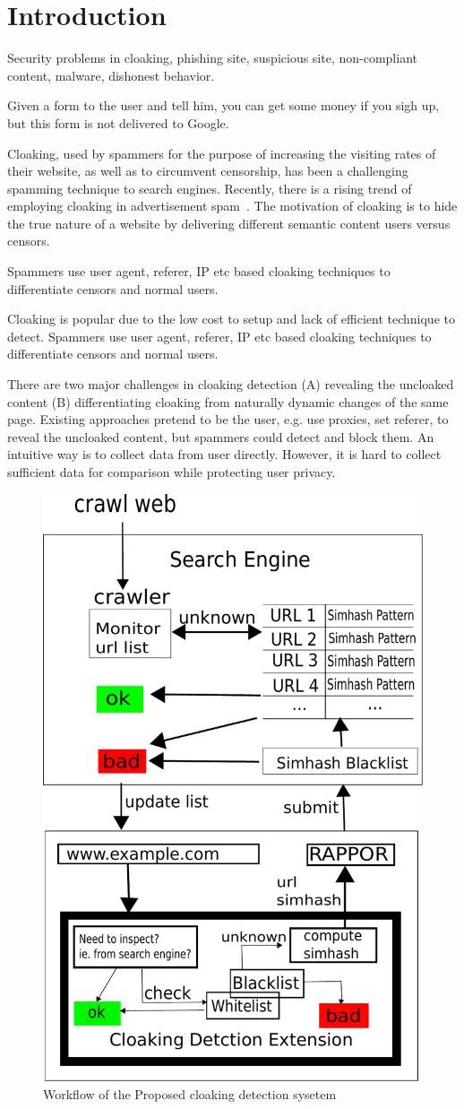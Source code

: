 \section{Introduction}
\label{s:intro}

Security problems in cloaking, phishing site, suspicious site, non-compliant
content, malware, dishonest behavior.

Given a form to the user and tell him, you can get some money if you sigh up,
but this form is not delivered to Google.



Cloaking, used by spammers for the purpose of increasing the visiting rates of
their website, as well as to circumvent censorship, has been a challenging
spamming technique to search engines. Recently, there is a rising trend of
employing cloaking in advertisement spam~\cite{li2012knowing}.  The motivation
of cloaking is to hide the true nature of a website by delivering different
semantic content users versus censors.

Spammers use user agent, referer, IP etc based cloaking techniques to
differentiate censors and normal users.

Cloaking is popular due to the low cost to setup and lack of efficient technique
to detect. Spammers use user agent, referer, IP etc based cloaking techniques to
differentiate censors and normal users.

There are two major challenges in cloaking detection (A) revealing the uncloaked
content (B) differentiating cloaking from naturally dynamic changes of the same
page. Existing approaches pretend to be the user, e.g. use proxies, set referer,
to reveal the uncloaked content, but spammers could detect and block them. An
intuitive way is to collect data from user directly. However, it is hard to
collect sufficient data for comparison while protecting user privacy.


\begin{figure}[t]
  \centering
  \includegraphics[width=.5\textwidth]{fig/workflow}
  \caption{Workflow of the Proposed cloaking detection sysetem}
  \label{fig:workflow}
\end{figure}




